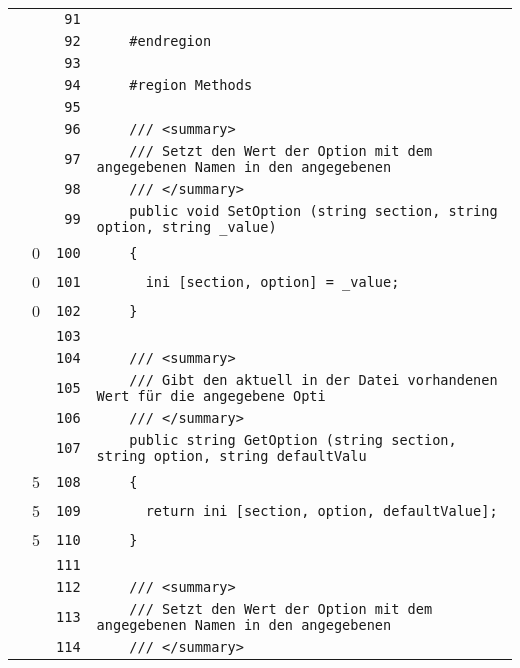 \documentclass[a4paper,10pt]{article}
\begin{document}
\begin{longtable}[l]{lrrl}
\cellcolor{gray} &  & \verb~91~ & \verb~~\\
\cellcolor{gray} &  & \verb~92~ & \verb~    #endregion~\\
\cellcolor{gray} &  & \verb~93~ & \verb~~\\
\cellcolor{gray} &  & \verb~94~ & \verb~    #region Methods~\\
\cellcolor{gray} &  & \verb~95~ & \verb~~\\
\cellcolor{gray} &  & \verb~96~ & \verb~    /// <summary>~\\
\cellcolor{gray} &  & \verb~97~ & \verb~    /// Setzt den Wert der Option mit dem angegebenen Namen in den angegebenen~\\
\cellcolor{gray} &  & \verb~98~ & \verb~    /// </summary>~\\
\cellcolor{gray} &  & \verb~99~ & \verb~    public void SetOption (string section, string option, string _value)~\\
\cellcolor{red} & 0 & \verb~100~ & \verb~    {~\\
\cellcolor{red} & 0 & \verb~101~ & \verb~      ini [section, option] = _value;~\\
\cellcolor{red} & 0 & \verb~102~ & \verb~    }~\\
\cellcolor{gray} &  & \verb~103~ & \verb~~\\
\cellcolor{gray} &  & \verb~104~ & \verb~    /// <summary>~\\
\cellcolor{gray} &  & \verb~105~ & \verb~    /// Gibt den aktuell in der Datei vorhandenen Wert für die angegebene Opti~\\
\cellcolor{gray} &  & \verb~106~ & \verb~    /// </summary>~\\
\cellcolor{gray} &  & \verb~107~ & \verb~    public string GetOption (string section, string option, string defaultValu~\\
\cellcolor{green} & 5 & \verb~108~ & \verb~    {~\\
\cellcolor{green} & 5 & \verb~109~ & \verb~      return ini [section, option, defaultValue];~\\
\cellcolor{green} & 5 & \verb~110~ & \verb~    }~\\
\cellcolor{gray} &  & \verb~111~ & \verb~~\\
\cellcolor{gray} &  & \verb~112~ & \verb~    /// <summary>~\\
\cellcolor{gray} &  & \verb~113~ & \verb~    /// Setzt den Wert der Option mit dem angegebenen Namen in den angegebenen~\\
\cellcolor{gray} &  & \verb~114~ & \verb~    /// </summary>~\\

\end{longtable}
\end{document}
